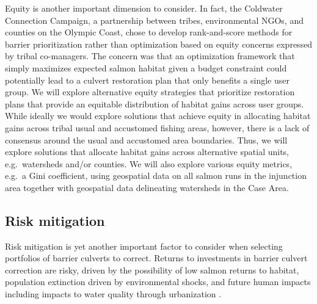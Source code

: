 Equity is another important dimension to consider. In fact, the Coldwater Connection Campaign, a partnership between tribes, environmental NGOs, and counties on the Olympic Coast, chose to develop rank-and-score methods for barrier prioritization rather than optimization based on equity concerns expressed by tribal co-managers. The concern was that an optimization framework that simply maximizes expected salmon habitat given a budget constraint could potentially lead to a culvert restoration plan that only benefits a single user group. We will explore alternative equity strategies that prioritize restoration plans that provide an equitable distribution of habitat gains across user groups. While ideally we would explore solutions that achieve equity in allocating habitat gains across tribal usual and accustomed fishing areas, however, there is a lack of consensus around the usual and accustomed area boundaries. Thus, we will explore solutions that allocate habitat gains across alternative spatial units, e.g.\ watersheds and/or counties. We will also explore various equity metrics, e.g.\ a Gini coefficient, using geospatial data on all salmon runs in the injunction area together with geospatial data delineating watersheds in the Case Area. 

\subsection*{Risk mitigation}

Risk mitigation is yet another important factor to consider when selecting portfolios of barrier culverts to correct. Returns to investments in barrier culvert correction are risky, driven by the possibility of low salmon returns to habitat, population extinction driven by environmental shocks, and future human impacts including impacts to water quality through urbanization \citep{ettinger_prioritizing_2021}. 


